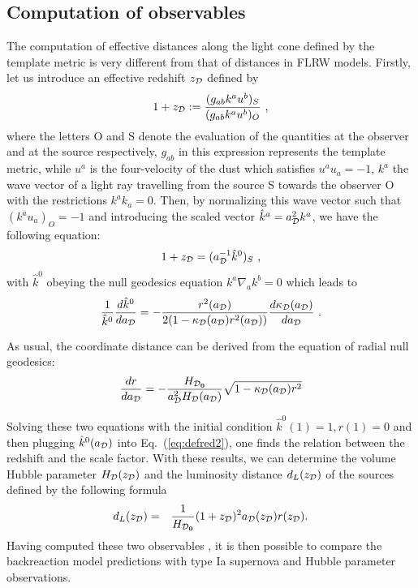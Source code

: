 \documentclass[preprint,preprintnumbers, prd, floatfix,  superscriptaddress,nofootinbib] {revtex4-1}
\newcommand{\CD}{{\cal D}}
\newcommand{\now}[1]{{#1_{\rm \bf 0}}}
\begin{document}
\subsection{Computation of observables}
The computation of effective distances along the light cone defined by the template metric is very different from that of distances in FLRW models. Firstly, let us introduce an effective redshift $z_{\CD}$ defined by
\begin{equation}
1+z_{\CD}:=\frac{(g_{ab}k^{a}u^{b})_{S}}{(g_{ab}k^{a}u^{b})_{O}}\mbox{ ,}
\end{equation}
where the letters O and S denote the evaluation of the quantities at the observer and at the source respectively, $g_{ab}$ in this expression represents the template metric, while $u^{a}$ is the four-velocity of the dust which satisfies $u^{a}u_{a}=-1$, $k^{a}$ the wave vector of a light ray travelling from the source S towards the observer O with the restrictions $k^{a}k_{a}=0$. Then, by normalizing this wave vector such that $(k^{a}u_{a})_{O}=-1$ and introducing the scaled vector $\hat{k}^{a}=a_{\CD}^{2}k^{a}$, we have the following equation:
\begin{equation}
\label{eq:defred2}
1+z_{\CD}=(a_{\CD}^{-1}\hat{k}^{0})_{S}\mbox{ ,}
\end{equation}
with $\hat{k}^{0}$ obeying the null geodesics equation $k^{a}\nabla_{a}k^{b}=0$ which leads to
\begin{equation}
\label{eq:evolk}
\frac{1}{\hat{k}^{0}}\frac{d\hat{k}^{0}}{da_{\CD}}=-\frac{r^{2}(a_{\CD})}{2(1-\kappa_{\CD}(a_{\CD})r^{2}(a_{\CD}))}\frac{d\kappa_{\CD}(a_{\CD})}{da_{\CD}}\mbox{ .}
\end{equation}

As usual, the coordinate distance can be derived from the equation of radial null geodesics:
\begin{equation}
\label{eq:coorddist}
\frac{dr}{da_{\CD}}=-\frac{H_{\now\CD}}{a_{\CD}^{2}H_{\CD}(a_{\CD})}\sqrt{1-\kappa_{\CD}(a_{\CD})r^{2}}
\end{equation}

Solving these two equations with the initial condition $\hat{k}^{0}(1)=1, r(1)=0 $ and then plugging $\hat{k}^{0}(a_\CD)$ into Eq.~(\ref{eq:defred2}), one finds the relation between the redshift and the scale factor. With these results, we can determine the volume Hubble parameter $H_{\CD}(z_{\CD})$ and the luminosity distance $d_{L}(z_{\CD})$ of the sources defined by the following formula
\begin{eqnarray}
\label{eq:distances}
d_{L}(z_{\CD})&=&\frac{1}{H_{\now\CD}}(1+z_{\CD})^{2}a_{\CD}(z_{\CD})r(z_{\CD}).
\end{eqnarray}
Having computed these two observables , it is then possible to compare the backreaction model predictions with type Ia supernova and Hubble parameter observations.
\end{document}
